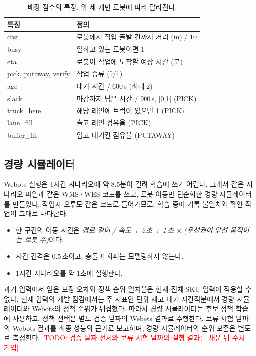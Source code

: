 \documentclass[10pt,twocolumn]{article}
\newcommand{\todo}[1]{\textcolor{red}{[TODO: #1]}}
\begin{document}
\begin{table}[t]
\centering
\caption{배정 점수의 특징. 위 세 개만 로봇에 따라 달라진다.} %
\label{tab:features}
\small
\begin{tabular}{ll}
\toprule
특징 & 정의 \\
\midrule
dist & 로봇에서 작업 출발 칸까지 거리 (m) / 10 \\
busy & 일하고 있는 로봇이면 1 \\
eta & 로봇이 작업에 도착할 예상 시간 (분) \\
\midrule
pick, putaway, verify & 작업 종류 (0/1) \\
age & 대기 시간 / 600\,s (최대 2) \\
slack & 마감까지 남은 시간 / 900\,s, [0,1] (PICK) \\
truck\_here & 해당 레인에 트럭이 있으면 1 (PICK) \\
lane\_fill & 출고 레인 점유율 (PICK) \\
buffer\_fill & 입고 대기칸 점유율 (PUTAWAY) \\
\bottomrule
\end{tabular}
\end{table}

\subsection{경량 시뮬레이터}
Webots 실행은 1시간 시나리오에 약 8.5분이 걸려 학습에 쓰기 어렵다.
그래서 같은 시나리오 파일과 같은 WMS·WES 코드를 쓰고, 로봇 이동만 단순화한 경량 시뮬레이터를 만들었다.
작업자 오류도 같은 코드로 들어가므로, 학습 중에 기록 불일치와 확인 작업이 그대로 나타난다.
\begin{itemize}
  \item 한 구간의 이동 시간은 \emph{경로 길이 / 속도 + 2\,초 + 1\,초 $\times$ (우선권이 앞선 움직이는 로봇 수)}이다.
  \item 시간 간격은 0.5\,초이고, 충돌과 회피는 모델링하지 않는다.
  \item 1시간 시나리오를 약 1초에 실행한다.
\end{itemize}
과거 입력에서 얻은 보정 오차와 정책 순위 일치율은 현재 전체 SKU 입력에 적용할 수 없다.
현재 입력의 개발 점검에서는 주 지표인 단위 재고 대기 시간적분에서 경량 시뮬레이터와 Webots의 정책 순위가 뒤집혔다.
따라서 경량 시뮬레이터는 후보 정책 학습에 사용하고, 정책 선택은 별도 검증 날짜의 Webots 결과로 수행한다.
보류 시험 날짜의 Webots 결과를 최종 성능의 근거로 보고하며, 경량 시뮬레이터의 순위 보존은 별도로 측정한다.
\todo{검증 날짜 전체와 보류 시험 날짜의 실행 결과를 채운 뒤 수치 기입}
\end{document}
